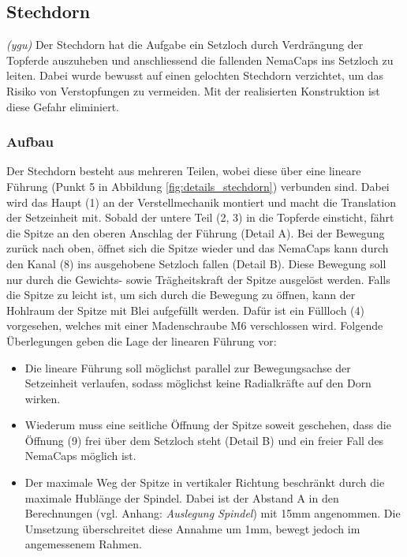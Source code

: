 \subsection{Stechdorn}
\textit{(ygu)} Der Stechdorn hat die Aufgabe ein Setzloch durch Verdrängung der Topferde auszuheben und anschliessend die fallenden NemaCaps ins Setzloch zu leiten. Dabei wurde bewusst auf einen gelochten Stechdorn verzichtet, um das Risiko von Verstopfungen zu vermeiden. Mit der realisierten Konstruktion ist diese Gefahr eliminiert. 
\subsubsection{Aufbau}
Der Stechdorn besteht aus mehreren Teilen, wobei diese über eine lineare Führung (Punkt 5 in Abbildung \ref{fig:details_stechdorn}) verbunden sind. Dabei wird das Haupt (1) an der Verstellmechanik montiert und macht die Translation der Setzeinheit mit. Sobald der untere Teil (2, 3) in die Topferde einsticht, fährt die Spitze an den oberen Anschlag der Führung (Detail A). Bei der Bewegung zurück nach oben, öffnet sich die Spitze wieder und das NemaCaps kann durch den Kanal (8) ins ausgehobene Setzloch fallen (Detail B). Diese Bewegung soll nur durch die Gewichts- sowie Trägheitskraft der Spitze ausgelöst werden. Falls die Spitze zu leicht ist, um sich durch die Bewegung zu öffnen, kann der Hohlraum der Spitze mit Blei aufgefüllt werden. Dafür ist ein Füllloch (4) vorgesehen, welches mit einer Madenschraube M6 verschlossen wird. Folgende Überlegungen geben die Lage der linearen Führung vor:
\begin{itemize}
	\item Die lineare Führung soll möglichst parallel zur Bewegungsachse der Setzeinheit verlaufen, sodass möglichst keine Radialkräfte auf den Dorn wirken.
	
	\item Wiederum muss eine seitliche Öffnung der Spitze soweit geschehen, dass die Öffnung (9) frei über dem Setzloch steht (Detail B) und ein freier Fall des NemaCaps möglich ist.
	
	\item Der maximale Weg der Spitze in vertikaler Richtung beschränkt durch die maximale Hublänge der Spindel. Dabei ist der Abstand A in den Berechnungen (vgl. Anhang: \textit{Auslegung Spindel}) mit 15mm angenommen. Die Umsetzung überschreitet diese Annahme um 1mm, bewegt jedoch im angemessenem Rahmen.
\end{itemize}

